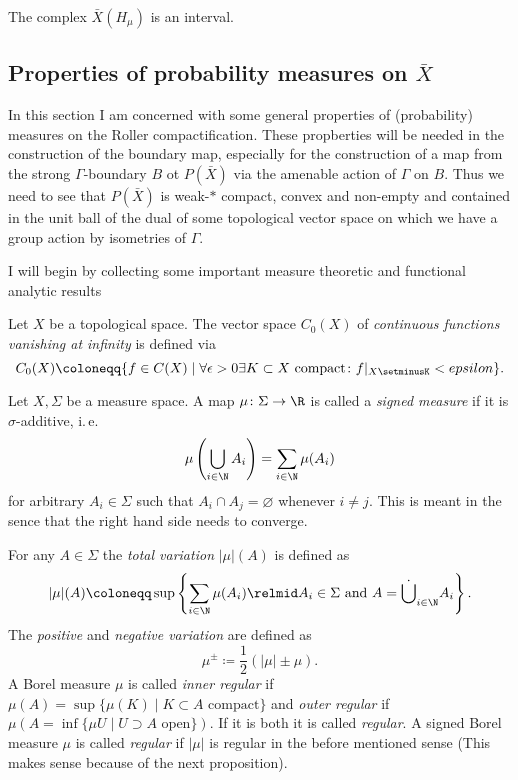 \begin{lemma}[{\cite[Lem. 4.7]{MR3509968}}]
  The complex \(\bar X(H_\mu)\) is an interval.
\end{lemma}

\subsection{Properties of probability measures on \(\bar X\)}
\label{sec:prob}

In this section I am concerned with some general properties of (probability) measures on the Roller compactification. These propberties will be needed in the construction of the boundary map, especially for the construction of a map from the strong \(\Gamma\)-boundary \(B\) ot \(P(\bar X)\) via the amenable action of \(\Gamma\) on \(B\). Thus we need to see that \(P(\bar X)\) is weak-\(\ast\) compact, convex and non-empty and contained in the unit ball of the dual of some topological vector space on which we have a group action by isometries of \(\Gamma\).

I will begin by collecting some important measure theoretic and functional analytic results

\begin{defin}
  Let \(X\) be a topological space. The vector space \(C_0(X)\) of \emph{continuous functions vanishing at infinity} is defined via
  \[
    C_0(X) \coloneqq \{f \in C(X) \mid \forall \epsilon > 0 \exists K \subset X \text{ compact}\colon f|_{X\setminusK } < epsilon\}.
  \]
\end{defin}

\begin{defin}
  Let \(X, \Sigma\) be a measure space. A map \(\mu \colon \Sigma \to \R\) is called a \emph{signed measure} if it is \(\sigma\)-additive, i.\,e.
  \[
    \mu\left(\bigcup_{i \in \N}A_i \right) = \sum_{i \in \N} \mu(A_i)
  \]
  for arbitrary \(A_i \in \Sigma\) such that \(A_i \cap A_j = \varnothing\) whenever \(i \neq j\). This is meant in the sence that the right hand side needs to converge.

  For any \(A \in \Sigma\) the \emph{total variation} \(|\mu|(A)\) is defined as
  \[
    |\mu|(A) \coloneqq \sup \left\{\sum_{i \in \N} \mu(A_i) \relmid A_i \in \Sigma \text{ and } A = \dot \bigcup_{i \in \N} A_i \right \}.
  \]
  The \emph{positive} and \emph{negative variation} are defined as
  \[
    \mu^\pm \coloneqq \frac12 (|\mu| \pm \mu).
  \]
  A Borel measure \(\mu\) is called \emph{inner regular} if \(\mu(A) = \sup \{ \mu(K) \mid K \subset A \text{ compact}\}\) and \emph{outer regular} if \(\mu(A = \inf \{ \mu{U} \mid U \supset A \text{ open}\})\). If it is both it is called \emph{regular}. A signed Borel measure \(\mu\) is called \emph{regular} if \(|\mu|\) is regular in the before mentioned sense (This makes sense because of the next proposition).
\end{defin}

